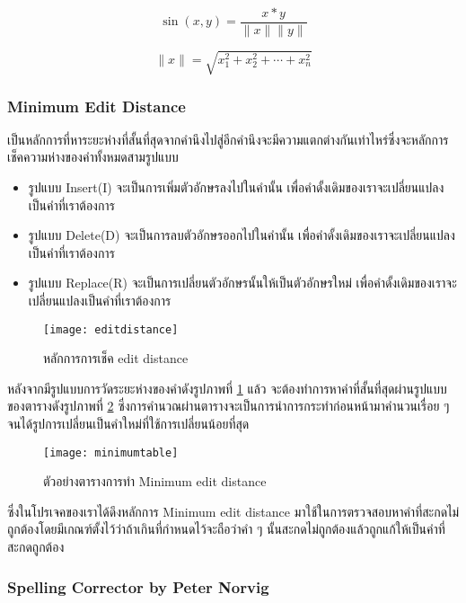 \begin{equation}
    \sin(x,y)=\frac{x*y}{\|x\|\|y\|}
\end{equation}    

\begin{equation}
    \|x\|=\sqrt{x_{1}^2+x_{2}^2+\cdots+x_{n}^2}
\end{equation}    
\subsubsection{Minimum Edit Distance}

เป็นหลักการที่หาระยะห่างที่สั้นที่สุดจากคำนึงไปสู่อีกคำนึงจะมีความแตกต่างกันเท่าไหร่ซึ่งจะหลักการเช็คความห่างของคำทั้งหมดสามรูปแบบ
\begin{itemize}
    \item รูปแบบ Insert(I) จะเป็นการเพิ่มตัวอักษรลงไปในคำนั้น เพื่อคำดั้งเดิมของเราจะเปลี่ยนแปลงเป็นคำที่เราต้องการ
    \item รูปแบบ Delete(D) จะเป็นการลบตัวอักษรออกไปในคำนั้น เพื่อคำดั้งเดิมของเราจะเปลี่ยนแปลงเป็นคำที่เราต้องการ
    \item รูปแบบ Replace(R) จะเป็นการเปลี่ยนตัวอักษรนั้นให้เป็นตัวอักษรใหม่ เพื่อคำดั้งเดิมของเราจะเปลี่ยนแปลงเป็นคำที่เราต้องการ
\end{itemize}
\begin{figure}[H]
    \centering
    \texttt{[image: editdistance]}
    \caption{หลักการการเช็ค edit distance \cite{ritambhara}}\label{fig:editdistance}
\end{figure}
หลังจากมีรูปแบบการวัดระยะห่างของคำดังรูปภาพที่ \ref{fig:editdistance} แล้ว จะต้องทำการหาคำที่สั้นที่สุดผ่านรูปแบบของตารางดังรูปภาพที่ \ref{fig:minimumtable} ซึ่งการคำนวณผ่านตารางจะเป็นการนำการกระทำก่อนหน้ามาคำนวนเรื่อย ๆ จนได้รูปการเปลี่ยนเป็นคำใหม่ที่ใช้การเปลี่ยนน้อยที่สุด
\begin{figure}[H]
    \centering
    \texttt{[image: minimumtable]}
    \caption{ตัวอย่างตารางการทำ Minimum edit distance \cite{ritambhara}}\label{fig:minimumtable}
\end{figure}

ซึ่งในโปรเจคของเราได้ดึงหลักการ Minimum edit distance มาใช้ในการตรวจสอบหาคำที่สะกดไม่ถูกต้องโดยมีเกณฑ์ตั้งไว้ว่าถ้าเกินที่กำหนดไว้จะถือว่าคำ ๆ นั้นสะกดไม่ถูกต้องแล้วถูกแก้ให้เป็นคำที่สะกดถูกต้อง

\subsubsection{Spelling Corrector by Peter Norvig}


